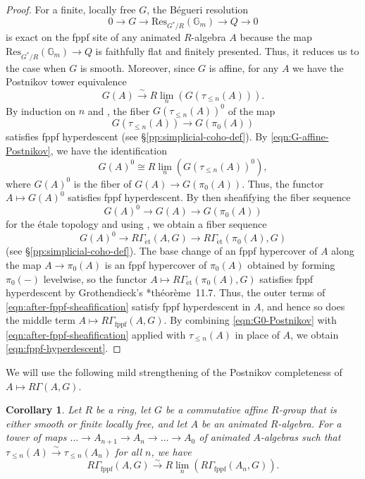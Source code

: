 \documentclass[11pt, reqno]{amsart}
\newcommand{\et}{\mathrm{\acute{e}t}}	%
\newcommand{\fppf}{\mathrm{fppf}}		%
\newcommand{\isomto}{\overset{\sim}{\longrightarrow}}
\providecommand{\p}[1]{\left(#1\right)}
\newcommand{\ra}{\rightarrow}
\newcommand{\tst}{\textstyle}
\newcommand{\be}{\begin{equation}}
\newcommand{\ee}{\end{equation}}
\newcommand{\bcor}{\begin{cor}}
\newcommand{\ecor}{\end{cor}}
\numberwithin{equation}{numberingbase}
\theoremstyle{thms}
\newtheorem{cor}[numberingbase]{Corollary}
\theoremstyle{claims}
\theoremstyle{defs}
\theoremstyle{thms}
\theoremstyle{defs}
\theoremstyle{subsection-tweak}
\theoremstyle{subsection-tweak}
\begin{document}
\begin{proof} 
For a finite, locally free $G$, the B\'{e}gueri resolution
\be \label{Begueri}
0\to G\to \mathrm{Res}_{G^\ast/R} (\mathbb G_m) \to Q\to 0
\ee
is exact on the fppf site of any animated $R$-algebra $A$ because the map $\mathrm{Res}_{G^\ast/R} (\mathbb G_m) \to Q$ is faithfully flat and finitely presented. Thus, it reduces us to the case when $G$ is smooth. Moreover, since $G$ is affine, for any $A$ we have the Postnikov tower equivalence
\be \label{eqn:G-affine-Postnikov}
\tst G(A)\isomto R\lim_n (G(\tau_{\leq n} (A))).
\ee
By induction on $n$ and , the fiber $G(\tau_{\leq n}(A))^0$ of the map
\[
G(\tau_{\leq n}(A))\to G(\pi_0(A))
\]
satisfies fppf hyperdescent (see \S\ref{pp:simplicial-coho-def}). %
 By \eqref{eqn:G-affine-Postnikov}, we have the identification
\be \label{eqn:G0-Postnikov}
\tst G(A)^0 \cong R\lim_n \p{G(\tau_{\leq n}(A))^0}, 
\ee
where $G(A)^0$ is the fiber of $G(A)\to G(\pi_0(A))$. Thus, the functor $A \mapsto G(A)^0$ satisfies fppf hyperdescent. By then sheafifying the fiber sequence
\[
G(A)^0 \to G(A)\to G(\pi_0(A))
\]
for the \'etale topology and using , we obtain a fiber sequence 
\be \label{eqn:after-fppf-sheafification}
G(A)^0 \to R\Gamma_\et(A,G)\to R\Gamma_\et(\pi_0(A),G)
\ee
(see \S\ref{pp:simplicial-coho-def}). The base change of an fppf hypercover of $A$ along the map $A \ra \pi_0(A)$ is an fppf hypercover of $\pi_0(A)$ obtained by forming $\pi_0(-)$ levelwise, so the functor $A\mapsto R\Gamma_\et(\pi_0(A), G)$ satisfies fppf hyperdescent by Grothendieck's \cite{Gro68c}*{th\'{e}or\`{e}me~11.7}. Thus, the outer terms of \eqref{eqn:after-fppf-sheafification} satisfy fppf hyperdescent in $A$, and hence so does the middle term $A \mapsto R\Gamma_\fppf(A, G)$. By combining \eqref{eqn:G0-Postnikov} with \eqref{eqn:after-fppf-sheafification} applied with $\tau_{\le n}(A)$ in place of $A$, we obtain \eqref{eqn:fppf-hyperdescent}.
\end{proof}



We will use the following mild strengthening of the Postnikov completeness of $A\mapsto R\Gamma(A, G)$. 

\bcor \label{cor:fppf-hyperdescent}
Let $R$ be a ring, let $G$ be a commutative affine $R$-group that is either smooth or finite locally free, and let $A$ be an animated $R$-algebra. For a tower of maps $\dotsc \ra A_{n + 1} \ra A_n \ra \dotsc \ra A_0$ of animated $A$-algebras such that $\tau_{\le n}(A) \isomto \tau_{\le n}(A_n)$ for all $n$, we have
\be \label{eqn:similar-to-Postnikov-tower}
\tst R\Gamma_\fppf(A,G)\isomto R\lim_n (R\Gamma_\fppf(A_n,G)).
\ee
\ecor
\end{document}
